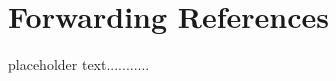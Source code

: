 \newpage
\section[Forwarding References]{Forwarding References}\label{forwardingref}

placeholder text...........


